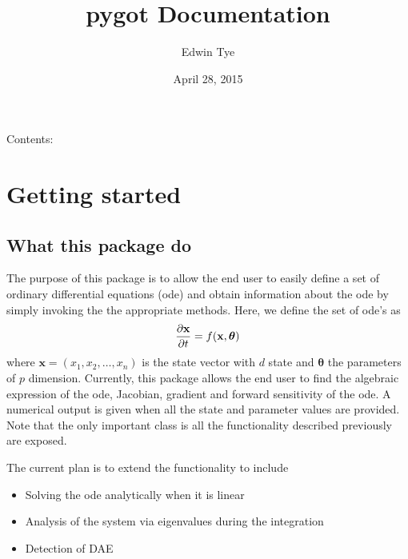 \documentclass[letterpaper,10pt,english]{sphinxmanual}
\title{pygot Documentation}
\date{April 28, 2015}
\author{Edwin Tye}
\begin{document}
\maketitle
\tableofcontents
{}\label{index::doc}


Contents:


\chapter{Getting started}
\label{getting_started:getting-started}\label{getting_started::doc}\label{getting_started:welcome-to-pygot-s-documentation}\label{getting_started:id1}

\section{What this package do}
\label{getting_started:what-this-package-do}\label{getting_started:package-purpose}
The purpose of this package is to allow the end user to easily define a set of ordinary differential equations (ode) and obtain information about the ode by simply invoking the the appropriate methods.  Here, we define the set of ode's as
\begin{gather}
\begin{split}\frac{\partial \mathbf{x}}{\partial t} = f(\mathbf{x},\boldsymbol{\theta})\end{split}\notag
\end{gather}
where \(\mathbf{x} = \left(x_{1},x_{2},\ldots,x_{n}\right)\) is the state vector with \(d\) state and \(\boldsymbol{\theta}\) the parameters of \(p\) dimension.  Currently, this package allows the end user to find the algebraic expression of the ode, Jacobian, gradient and forward sensitivity of the ode.  A numerical output is given when all the state and parameter values are provided.   Note that the only important class is  all the functionality described previously are exposed.

The current plan is to extend the functionality to include
\begin{itemize}
\item {} 
Solving the ode analytically when it is linear

\item {} 
Analysis of the system via eigenvalues during the integration

\item {} 
Detection of DAE

\end{itemize}
\end{document}
